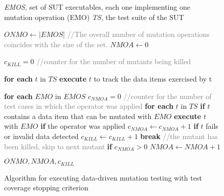 

\begin{figure}[tb]

\begin{algorithmic}[1]

\scriptsize
\Require \emph{EMOS}, set of SUT executables, each one implementing one mutation operation (EMO)
\Require \emph{TS}, the test suite of the SUT

\State $\mathit{ONMO} \gets |EMOS|$ \textcolor{gray}{//The overall number of mutation operations coincides with the size of the set.} 
\State $\mathit{NMOA} \gets 0$

\State $c_{\mathit{KILL}}=0$ \textcolor{gray}{//counter for the number of mutants being killed} 

\State \textbf{for each} $t$ in $TS$ 
\State \hspace{5 mm} \textbf{execute} $t$ to track the data items exercised by t \label{alg:dataProcess:prel}

\State \textbf{for each} $EMO$ in $EMOS$ \label{alg:dataProcess:repeat}
\State \hspace{5 mm} $c_{\mathit{NMOA}}=0$ \textcolor{gray}{//counter for the number of test cases in which the operator was applied} 
\State \hspace{5 mm} \textbf{for each} $t$ in $TS$ 
\State \hspace{10 mm} \textbf{if} $t$ contains a data item that can be mutated with $EMO$ \label{alg:dataProcess:cover}
\State \hspace{15 mm} \textbf{execute} $t$ with $EMO$ \label{alg:dataProcess:execute}
\State \hspace{15 mm} \textbf{if} the operator was applied
\State \hspace{20 mm} $c_{\mathit{NMOA}} \gets c_{\mathit{NMOA}}+1$
\State \hspace{15 mm} \textbf{if} $t$ fails or invalid data detected  \label{alg:dataProcess:kill}
\State \hspace{20 mm} $c_{\mathit{KILL}} \gets c_{\mathit{KILL}} +1$
\State \hspace{20 mm} \textbf{break} \textcolor{gray}{//the mutant has been killed, skip to next mutant} \label{alg:dataProcess:stop}
\State \hspace{5 mm} \textbf{if} $c_{\mathit{NMOA}} > 0$
\State \hspace{10 mm} $\mathit{NMOA} \gets \mathit{NMOA} + 1$

\State \Return $\mathit{ONMO},\mathit{NMOA},c_{\mathit{KILL}}$

\end{algorithmic}
\vspace{-3mm}
\caption{Algorithm for executing data-driven mutation testing with test coverage stopping criterion}
\label{alg:dataProcess}
\end{figure}



